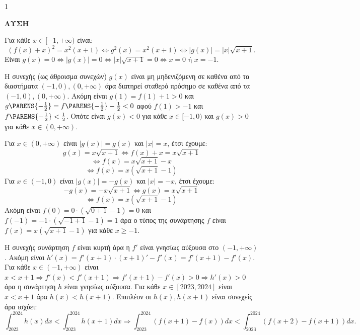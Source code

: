 \begin{ylh}{1}
    \item [Ύλη από εικόνα]
\end{ylh}
\textbf{ΛΥΣΗ}
\begin{alist}
\item [\textalpha)]
\begin{rlist}
\item [i.] Για κάθε $x \in [-1,+\infty)$ είναι:
\[ (f(x)+x)^2 = x^2(x+1) \Leftrightarrow g^2(x)=x^2(x+1) \Leftrightarrow |g(x)|=|x|\sqrt{x+1}. \]
Είναι $g(x)=0 \Leftrightarrow |g(x)|=0 \Leftrightarrow |x|\sqrt{x+1}=0 \Leftrightarrow x=0 \text{ ή } x=-1$.
\item [ii.] Η συνεχής (ως άθροισμα συνεχών) $g(x)$ είναι μη μηδενιζόμενη σε καθένα από τα διαστήματα $(-1,0), (0,+\infty)$ άρα διατηρεί σταθερό πρόσημο σε καθένα από τα $(-1,0), (0,+\infty)$.
Ακόμη είναι $g(1)=f(1)+1 > 0$ και $g\PARENS{-\frac{1}{2}} = f\PARENS{-\frac{1}{2}} - \frac{1}{2} < 0$ αφού $f(1)>-1$ και $f\PARENS{-\frac{1}{2}} < \frac{1}{2}$.
Οπότε είναι $g(x)<0$ για κάθε $x \in [-1,0)$ και $g(x)>0$ για κάθε $x \in (0,+\infty)$.
\end{rlist}

\item [\textbeta)] Για $x \in (0,+\infty)$ είναι $|g(x)|=g(x)$ και $|x|=x$, έτσι έχουμε:
\[
g(x)=x\sqrt{x+1} \Leftrightarrow f(x)+x=x\sqrt{x+1}
\]
\[
\Leftrightarrow f(x)=x\sqrt{x+1}-x
\]
\[
\Leftrightarrow f(x)=x(\sqrt{x+1}-1)
\]
Για $x \in (-1,0)$ είναι $|g(x)|=-g(x)$ και $|x|=-x$, έτσι έχουμε:
\[
-g(x)=-x\sqrt{x+1} \Leftrightarrow g(x)=x\sqrt{x+1}
\]
\[
\Leftrightarrow f(x)=x(\sqrt{x+1}-1)
\]
Ακόμη είναι $f(0)=0 \cdot (\sqrt{0+1}-1)=0$ και $f(-1)=-1 \cdot (\sqrt{-1+1}-1)=1$ άρα ο τύπος της συνάρτησης $f$ είναι $f(x)=x(\sqrt{x+1}-1)$ για κάθε $x \ge -1$.

\item [\textgamma)] Η συνεχής συνάρτηση $f$ είναι κυρτή άρα η $f'$ είναι γνησίως αύξουσα στο $(-1,+\infty)$.
Ακόμη είναι $h'(x)=f'(x+1)\cdot(x+1)'-f'(x)=f'(x+1)-f'(x)$.
Για κάθε $x \in (-1,+\infty)$ είναι $x < x+1 \Rightarrow f'(x) < f'(x+1) \Rightarrow f'(x+1)-f'(x) > 0 \Rightarrow h'(x) > 0$ άρα η συνάρτηση $h$ είναι γνησίως αύξουσα.
Για κάθε $x \in [2023,2024]$ είναι $x < x+1$ άρα $h(x) < h(x+1)$.
Επιπλέον οι $h(x), h(x+1)$ είναι συνεχείς άρα ισχύει:
\[
\int_{2023}^{2024} h(x)dx < \int_{2023}^{2024} h(x+1)dx \Rightarrow \int_{2023}^{2024} (f(x+1)-f(x))dx < \int_{2023}^{2024} (f(x+2)-f(x+1))dx.
\]
\end{alist}